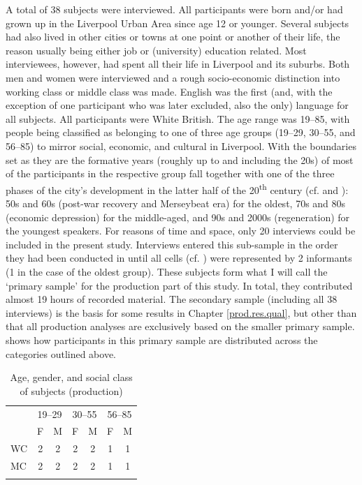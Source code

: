 A total of 38 subjects were interviewed.
All participants were born and/or had grown up in the Liverpool Urban Area since age 12 or younger.
Several subjects had also lived in other cities or towns at one point or another of their life, the reason usually being either job or (university) education related.
Most interviewees, however, had spent all their life in Liverpool and its suburbs.
Both men and women were interviewed and a rough socio-economic distinction into working class or middle class was made.
English was the first (and, with the exception of one participant who was later excluded, also the only) language for all subjects.
All participants were White British.
The age range was 19--85, with people being classified as belonging to one of three age groups (19--29, 30--55, and 56--85) to mirror social, economic, and cultural  in Liverpool.
With the boundaries set as they are the formative years (roughly up to and including the 20s) of most of the participants in the respective group fall together with one of the three phases of the city's development in the latter half of the 20\textsuperscript{th} century (cf.  and ): 50s and 60s (post-war recovery and Merseybeat era) for the oldest, 70s and 80s (economic depression) for the middle-aged, and 90s and 2000s (regeneration) for the youngest speakers.
For reasons of time and space, only 20 interviews could be included in the present study.
Interviews entered this sub-sample in the order they had been conducted in until all cells (cf. ) were represented by 2 informants (1 in the case of the oldest group).
These subjects form what I will call the `primary sample' for the production part of this study.
In total, they contributed almost 19 hours of recorded material.
The secondary sample (including all 38 interviews) is the basis for some results in Chapter \ref{prod.res.qual}, but other than that all production analyses are exclusively based on the smaller primary sample.
 shows how participants in this primary sample are distributed across the categories outlined above.

	\begin{table}
		
		\caption{Age, gender, and social class of subjects (production)}
		\label{tab.participants}
		\begin{tabular}{lcccccc}
			\lsptoprule
			& \multicolumn{2}{c}{19--29} & \multicolumn{2}{c}{30--55} & \multicolumn{2}{c}{56--85}\\
			& F & M & F & M & F & M\\
			\midrule
			WC & 2 & 2 & 2 & 2 & 1 & 1\\
			MC & 2 & 2 & 2 & 2 & 1 & 1\\
			\lspbottomrule
		\end{tabular}
	\end{table}

